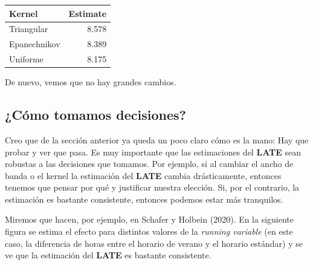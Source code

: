 \documentclass[
  letterpaper,
  DIV=11,
  numbers=noendperiod,
  oneside]{scrreprt}
\begin{document}
\begin{table}
\fontsize{12.0pt}{14.4pt}\selectfont
\begin{tabular*}{\linewidth}{@{\extracolsep{\fill}}lr}
\toprule
Kernel & Estimate \\ 
\midrule\addlinespace[2.5pt]
Triangular & 8.578 \\ 
Epanechnikov & 8.389 \\ 
Uniforme & 8.175 \\ 
\bottomrule
\end{tabular*}
\end{table}

De nuevo, vemos que no hay grandes cambios.

\hypertarget{cuxf3mo-tomamos-decisiones}{%
\subsection{¿Cómo tomamos
decisiones?}\label{cuxf3mo-tomamos-decisiones}}

Creo que de la sección anterior ya queda un poco claro cómo es la mano:
Hay que probar y ver que pasa. Es muy importante que las estimaciones
del \textbf{LATE} sean robustas a las decisiones que tomamos. Por
ejemplo, si al cambiar el ancho de banda o el kernel la estimación del
\textbf{LATE} cambia drásticamente, entonces tenemos que pensar por qué
y justificar nuestra elección. Si, por el contrario, la estimación es
bastante consistente, entonces podemos estar más tranquilos.

Miremos que hacen, por ejemplo, en Schafer y Holbein
(2020).
En la siguiente figura se estima el efecto para distintos valores de la
\emph{running variable} (en este caso, la diferencia de horas entre el
horario de verano y el horario estándar) y se ve que la estimación del
\textbf{LATE} es bastante consistente.
\end{document}
